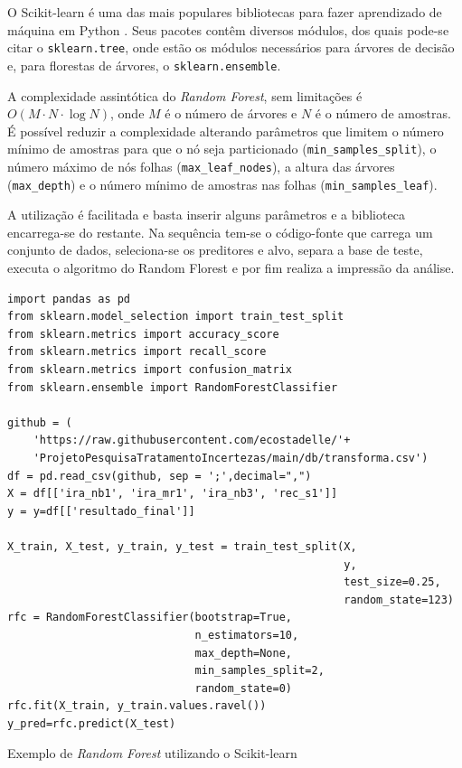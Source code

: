 \documentclass{article}
\begin{document}
O Scikit-learn \cite{scikit-learn} é uma das mais populares bibliotecas para fazer aprendizado de máquina em Python \cite{Grus_2019}. Seus pacotes contêm diversos módulos, dos quais pode-se citar o \texttt{sklearn.tree}, onde estão os módulos necessários para árvores de decisão e, para florestas de árvores, o \texttt{sklearn.ensemble}.

A complexidade assintótica do \emph{Random Forest}, sem limitações é $O(M\cdot N \cdot\log{N})$, onde $M$ é o número de árvores e $N$ é o número de amostras. É possível reduzir a complexidade alterando parâmetros que limitem o número mínimo de amostras para que o nó seja particionado (\texttt{min\_samples\_split}), o número máximo de nós folhas (\texttt{max\_leaf\_nodes}), a altura das árvores (\texttt{max\_depth}) e o número mínimo de amostras nas folhas (\texttt{min\_samples\_leaf}).

A utilização é facilitada e basta inserir alguns parâmetros e a biblioteca encarrega-se do restante. Na sequência tem-se o código-fonte que carrega um conjunto de dados, seleciona-se os preditores e alvo, separa a base de teste, executa o algoritmo do Random Florest e por fim realiza a impressão da análise.


\begin{listing}[H]
\begin{verbatim}
import pandas as pd
from sklearn.model_selection import train_test_split
from sklearn.metrics import accuracy_score
from sklearn.metrics import recall_score
from sklearn.metrics import confusion_matrix
from sklearn.ensemble import RandomForestClassifier

github = (
    'https://raw.githubusercontent.com/ecostadelle/'+
    'ProjetoPesquisaTratamentoIncertezas/main/db/transforma.csv')
df = pd.read_csv(github, sep = ';',decimal=",")
X = df[['ira_nb1', 'ira_mr1', 'ira_nb3', 'rec_s1']]
y = y=df[['resultado_final']]

X_train, X_test, y_train, y_test = train_test_split(X, 
                                                    y, 
                                                    test_size=0.25, 
                                                    random_state=123)
rfc = RandomForestClassifier(bootstrap=True,
                             n_estimators=10,
                             max_depth=None,
                             min_samples_split=2,
                             random_state=0)
rfc.fit(X_train, y_train.values.ravel())
y_pred=rfc.predict(X_test)
\end{verbatim}
\caption{Exemplo de \emph{Random Forest} utilizando o Scikit-learn}
\end{listing}
\end{document}
